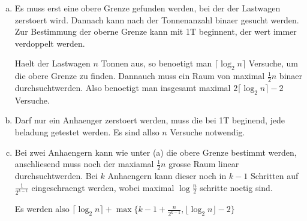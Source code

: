 \begin{enumerate}[(a)]
\item Es muss erst eine obere Grenze gefunden werden, bei der der Lastwagen zerstoert wird. Dannach kann nach der 
    Tonnenanzahl binaer gesucht werden. Zur Bestimmung der oberne Grenze kann mit 1T beginnent, der wert immer verdoppelt werden.

    Haelt der Lastwagen $n$ Tonnen aus, so benoetigt man $\lceil \log_2 n \rceil$ Versuche, um die obere Grenze zu finden.
    Dannauch muss ein Raum von maximal $\frac{1}{2}n$ binaer durchsuchtwerden. Also benoetigt man insgesamt
    maximal $2 \lceil \log_2 n \rceil - 2$ Versuche.

\item Darf nur ein Anhaenger zerstoert werden, muss die bei 1T beginend, jede beladung getestet werden.
    Es sind allso $n$ Versuche notwendig.

\item Bei zwei Anhaengern kann wie unter (a) die obere Grenze bestimmt werden, anschliesend muss noch der maxiamal
    $\frac{1}{2}n$ grosse Raum linear durchsuchtwerden. Bei $k$ Anhaengern kann dieser noch in $k-1$ Schritten auf $\frac{1}{2^{k-1}}$ 
    eingeschraengt werden, wobei maximal $\log \frac{n}{2}$ schritte noetig sind.

    Es werden also $\lceil \log_2 n \rceil + \max \{ k-1 + \frac{n}{2^{k-1}}, \lfloor \log_2 n \rfloor - 2\}$

\end{enumerate}


